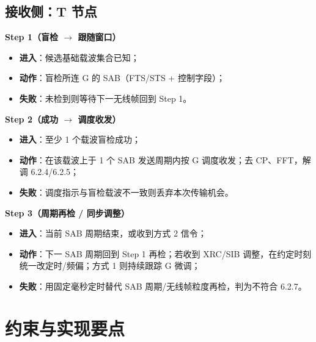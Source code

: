 \documentclass[11pt,a4paper]{ctexart}
\begin{document}
\subsection{接收侧：T 节点}

\textbf{Step 1（盲检 $\rightarrow$ 跟随窗口）}
\begin{itemize}[nosep]
  \item \textbf{进入}：候选基础载波集合已知；
  \item \textbf{动作}：盲检所连 G 的 SAB（FTS/STS + 控制字段）；
  \item \textbf{失败}：未检到则等待下一无线帧回到 Step 1。
\end{itemize}

\textbf{Step 2（成功 $\rightarrow$ 调度收发）}
\begin{itemize}[nosep]
  \item \textbf{进入}：至少 1 个载波盲检成功；
  \item \textbf{动作}：在该载波上于 1 个 SAB 发送周期内按 G 调度收发；去 CP、FFT，解调 6.2.4/6.2.5；
  \item \textbf{失败}：调度指示与盲检载波不一致则丢弃本次传输机会。
\end{itemize}

\textbf{Step 3（周期再检 / 同步调整）}
\begin{itemize}[nosep]
  \item \textbf{进入}：当前 SAB 周期结束，或收到方式 2 信令；
  \item \textbf{动作}：下一 SAB 周期回到 Step 1 再检；若收到 XRC/SIB 调整，在约定时刻统一改定时/频偏；方式 1 则持续跟踪 G 微调；
  \item \textbf{失败}：用固定毫秒定时替代 SAB 周期/无线帧粒度再检，判为不符合 6.2.7。
\end{itemize}

\section{约束与实现要点}
\end{document}
